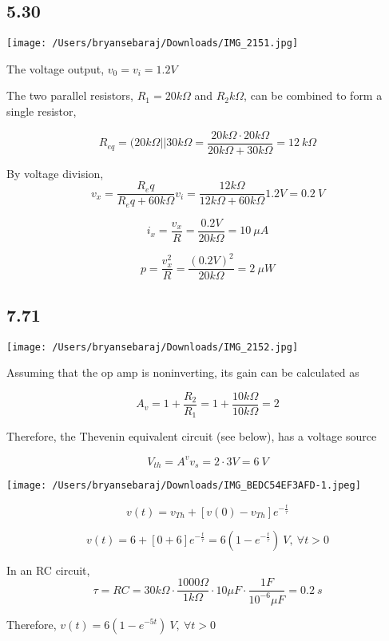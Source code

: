 \documentclass{article}
\begin{document}
\subsection*{5.30}

\texttt{[image: /Users/bryansebaraj/Downloads/IMG\_2151.jpg]}

The voltage output, $v_0=v_i=1.2 V$

The two parallel resistors, $R_1=20 k\Omega$ and $R_2 k\Omega$, can be combined to form a single resistor, 

$$R_{eq}=(20 k\Omega || 30 k\Omega = \frac{20 k\Omega \cdot 20 k\Omega}{20 k\Omega + 30 k\Omega}=12 \ k\Omega$$

By voltage division, 
$$v_x=\frac{R_eq}{R_eq + 60 k\Omega}v_i=\frac{12 k\Omega}{12 k\Omega + 60 k\Omega}1.2 V=0.2 \ V$$

$$i_x=\frac{v_x}{R}=\frac{0.2 V}{20 k\Omega}=10 \ \mu A$$

$$p=\frac{v_x^2}{R}=\frac{(0.2 V)^2}{20 k\Omega}= 2 \ \mu W$$



\subsection*{7.71}

\texttt{[image: /Users/bryansebaraj/Downloads/IMG\_2152.jpg]}

Assuming that the op amp is noninverting, its gain can be calculated as

$$A_v=1 + \frac{R_2}{R_1}=1+\frac{10 k\Omega}{10 k\Omega}=2$$

Therefore, the Thevenin equivalent circuit (see below), has a voltage source

$$V_{th}=A^v v_s = 2 \cdot 3 V = 6 \ V$$

\texttt{[image: /Users/bryansebaraj/Downloads/IMG\_BEDC54EF3AFD-1.jpeg]}

$$v(t)=v_{Th}+[v(0)-v_{Th}]e^{-\frac{t}{\tau}}$$

$$v(t)=6 + [0 + 6]e^{-\frac{t}{\tau}}=6(1-e^{-\frac{t}{\tau}}) \ V, \  \forall t > 0$$

In an RC circuit, 
$$\tau = RC=30 k\Omega \cdot \frac{1000 \Omega}{1 k\Omega} \cdot 10 \mu F \cdot \frac{1 F}{10^{-6}\mu F}=0.2 \ s$$

Therefore, $v(t)=6(1-e^{-5t}) \ V, \  \forall t > 0$
\end{document}

